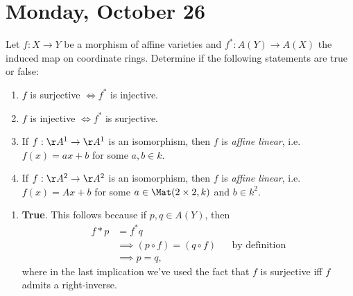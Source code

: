 \hypertarget{monday-october-26}{%
\section{Monday, October 26}\label{monday-october-26}}

\begin{problem}[Gathmann 4.13]

Let \(f:X\to Y\) be a morphism of affine varieties and
\(f^*: A(Y) \to A(X)\) the induced map on coordinate rings. Determine if
the following statements are true or false:

\begin{enumerate}
\def\labelenumi{\alph{enumi}.}
\item
  \(f\) is surjective \(\iff f^*\) is injective.
\item
  \(f\) is injective \(\iff f^*\) is surjective.
\item
  If \(f:\AA^1\to\AA^1\) is an isomorphism, then \(f\) is \emph{affine
  linear}, i.e.~\(f(x) = ax+b\) for some \(a, b\in k\).
\item
  If \(f:\AA^2\to\AA^2\) is an isomorphism, then \(f\) is \emph{affine
  linear}, i.e.~\(f(x) = Ax+b\) for some \(a \in \Mat(2\times 2, k)\)
  and \(b\in k^2\).
\end{enumerate}

\end{problem}

\begin{solution}

\hfill

\begin{enumerate}
\def\labelenumi{\alph{enumi}.}
\tightlist
\item
  \textbf{True}. This follows because if \(p, q\in A(Y)\), then
  \begin{align*}  
    f* p &= f^* q \\
    &\implies (p\circ f) = (q\circ f) && \text{by definition}\\
    &\implies p = q 
    ,\end{align*} where in the last implication we've used the fact that
  \(f\) is surjective iff \(f\) admits a right-inverse.
\end{enumerate}

\end{solution}

